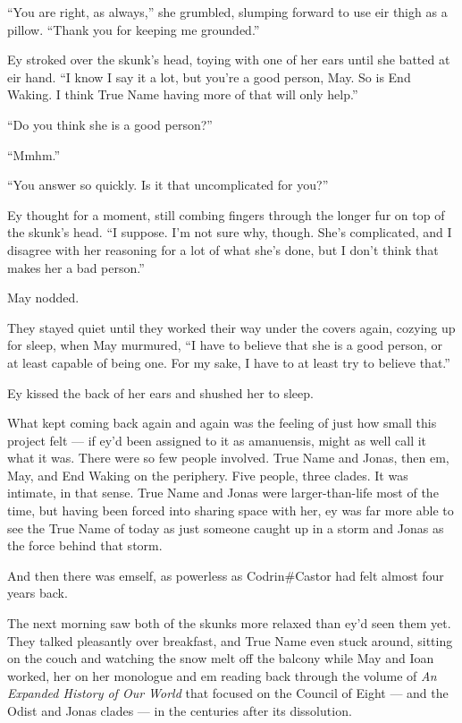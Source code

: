 ``You are right, as always,'' she grumbled, slumping forward to use eir thigh as a pillow. ``Thank you for keeping me grounded.''

Ey stroked over the skunk's head, toying with one of her ears until she batted at eir hand. ``I know I say it a lot, but you're a good person, May. So is End Waking. I think True Name having more of that will only help.''

``Do you think she is a good person?''

``Mmhm.''

``You answer so quickly. Is it that uncomplicated for you?''

Ey thought for a moment, still combing fingers through the longer fur on top of the skunk's head. ``I suppose. I'm not sure why, though. She's complicated, and I disagree with her reasoning for a lot of what she's done, but I don't think that makes her a bad person.''

May nodded.

They stayed quiet until they worked their way under the covers again, cozying up for sleep, when May murmured, ``I have to believe that she is a good person, or at least capable of being one. For my sake, I have to at least try to believe that.''

Ey kissed the back of her ears and shushed her to sleep.

What kept coming back again and again was the feeling of just how small this project felt — if ey'd been assigned to it as amanuensis, might as well call it what it was. There were so few people involved. True Name and Jonas, then em, May, and End Waking on the periphery. Five people, three clades. It was intimate, in that sense. True Name and Jonas were larger-than-life most of the time, but having been forced into sharing space with her, ey was far more able to see the True Name of today as just someone caught up in a storm and Jonas as the force behind that storm.

And then there was emself, as powerless as Codrin\#Castor had felt almost four years back.

The next morning saw both of the skunks more relaxed than ey'd seen them yet. They talked pleasantly over breakfast, and True Name even stuck around, sitting on the couch and watching the snow melt off the balcony while May and Ioan worked, her on her monologue and em reading back through the volume of \emph{An Expanded History of Our World} that focused on the Council of Eight — and the Odist and Jonas clades — in the centuries after its dissolution.

